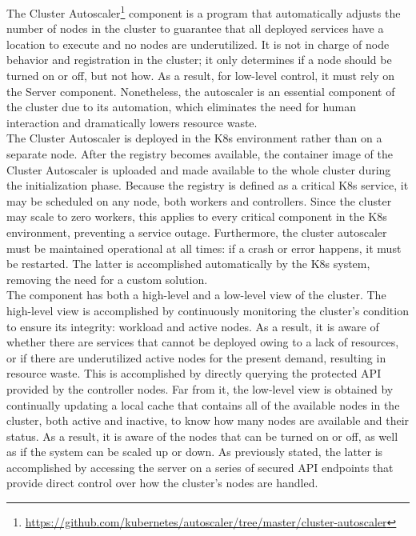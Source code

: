 The Cluster Autoscaler\footnote{\url{https://github.com/kubernetes/autoscaler/tree/master/cluster-autoscaler}}
component is a program that automatically adjusts the number of nodes in the
cluster to guarantee that all deployed services have a location to execute and
no nodes are underutilized. It is not in charge of node behavior and registration
in the cluster; it only determines if a node should be turned on or off, but not
how. As a result, for low-level control, it must rely on the Server component. Nonetheless,
the autoscaler is an essential component of the cluster due to its automation, which
eliminates the need for human interaction and dramatically lowers resource waste.
\\ %
The Cluster Autoscaler is deployed in the K8s environment rather than on a separate
node. After the registry becomes available, the container image of the Cluster Autoscaler
is uploaded and made available to the whole cluster during the initialization phase.
Because the registry is defined as a critical K8s service, it may be scheduled on
any node, both workers and controllers. Since the cluster may scale to zero workers,
this applies to every critical component in the K8s environment, preventing a service
outage. Furthermore, the cluster autoscaler must be maintained operational at all
times: if a crash or error happens, it must be restarted. The latter is
accomplished automatically by the K8s system, removing the need for a custom solution.
\\ %
The component has both a high-level and a low-level view of the cluster. The
high-level view is accomplished by continuously monitoring the cluster's
condition to ensure its integrity: workload and active nodes. As a result, it is
aware of whether there are services that cannot be deployed owing to a lack of resources,
or if there are underutilized active nodes for the present demand, resulting in resource
waste. This is accomplished by directly querying the protected API provided by
the controller nodes. Far from it, the low-level view is obtained by continually
updating a local cache that contains all of the available nodes in the cluster, both
active and inactive, to know how many nodes are available and their status. As a
result, it is aware of the nodes that can be turned on or off, as well as if the
system can be scaled up or down. As previously stated, the latter is accomplished
by accessing the server on a series of secured API endpoints that provide direct
control over how the cluster's nodes are handled. \\ %
